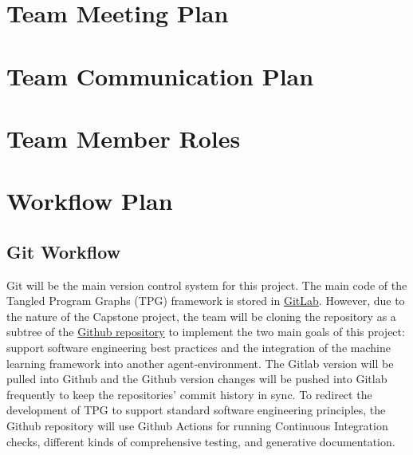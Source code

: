 \documentclass{article}
\begin{document}

\section{Team Meeting Plan}






\section{Team Communication Plan}


\section{Team Member Roles}


\section{Workflow Plan}

\subsection{Git Workflow}
Git will be the main version control system for this project. The main code of the Tangled Program Graphs (TPG) framework is stored in \href{https://gitlab.cas.mcmaster.ca/kellys32/tpg}{GitLab}. However, due to the nature of the Capstone project, the team will be cloning the repository as a subtree of the \href{https://github.com/TPGEngine/tpg}{Github repository} to implement the two main goals of this project: support software engineering best practices and the integration of the machine learning framework into another agent-environment. The Gitlab version will be pulled into Github and the Github version changes will be pushed into Gitlab frequently to keep the repositories’ commit history in sync. To redirect the development of TPG to support standard software engineering principles, the Github repository will use Github Actions for running Continuous Integration checks, different kinds of comprehensive testing, and generative documentation.
\end{document}
